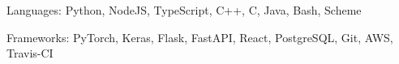 


\begin{cvskills}


\cvskill
{Languages:} %
{Python, NodeJS, TypeScript, C++, C, Java, Bash, Scheme} %


\cvskill
{Frameworks:} %
{PyTorch, Keras, Flask, FastAPI, React, PostgreSQL, Git, AWS, Travis-CI}


\end{cvskills}
